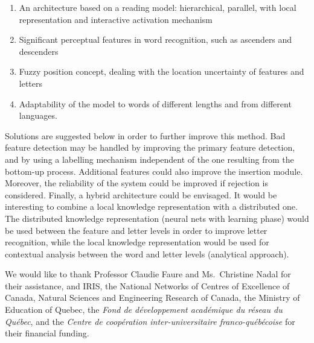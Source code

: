 \documentclass[ijdar]{svjour}
\begin{document}
\begin{enumerate}
\item An architecture based on a reading model: hierarchical, parallel, with local representation and interactive activation mechanism
\item Significant perceptual features in word recognition, such as ascenders and descenders
\item Fuzzy position concept, dealing with the location uncertainty of features and letters
\item Adaptability of the model to words of different\break
lengths and from different languages.
\end{enumerate}



Solutions are suggested below in order to further improve this method.
Bad feature detection may be handled by improving the primary feature detection, and by using a labelling mechanism independent of the one resulting from the bottom-up process.
Additional features could also improve the insertion module.
Moreover, the reliability of the system could be improved if rejection is considered.
Finally, a hybrid architecture could be envisaged.
It would be interesting to combine a local knowledge representation with a distributed one.
The distributed knowledge representation (neural nets with learning phase) would be used between the feature and letter levels in order to improve letter recognition, while the local knowledge representation would be used for contextual analysis between the word and letter levels (analytical approach).



\begin{acknowledgement}
We would like to thank Professor\break
Claudie Faure and Ms.~Christine Nadal for their assistance, and IRIS,
the National Networks of Centres of Excellence of Canada, Natural
Sciences and Engineering Research of Canada, the Ministry of Education
of Quebec, the {\it Fond de d\'eveloppement acad\'emique du r\'eseau du
Qu\'ebec}, and the\break
{\it Centre de coop\'era\-tion inter-universitaire
franco-qu\'eb\'ecoise} for their financial funding.
\end{acknowledgement}
\end{document}
